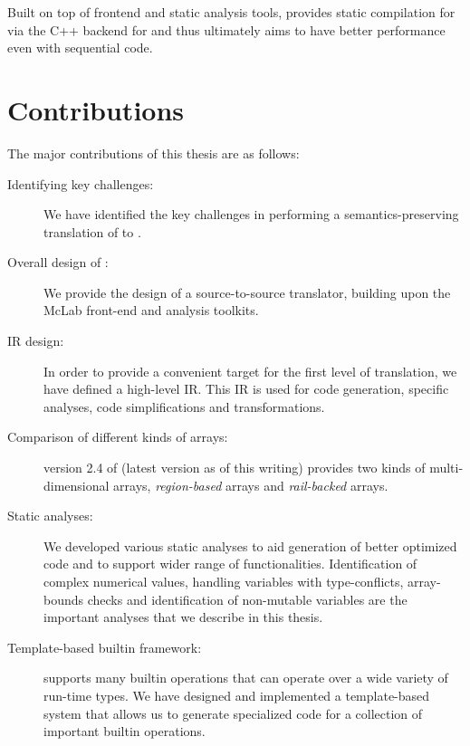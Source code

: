  Built on top of \mclab frontend and static analysis tools,
 \mixten provides static compilation for \matlab via the C++
backend for \xten and thus ultimately aims to have better performance even with
sequential code. 

\section{Contributions}
  
The major contributions  of this thesis are as follows:

\begin{description}

\item[Identifying key challenges:] We have identified the key challenges
in performing a semantics-preserving translation of \matlab to \xten.

\item[Overall design of \mixten:] We provide the design of a 
source-to-source translator, building upon the McLab front-end and
analysis toolkits.

\item[\mixten IR design:] In order to provide a convenient
target for the first level of translation, we have defined a high-level
\mixten IR.  This IR is used for code generation, \xten specific analyses, 
code simplifications and transformations.

\item[Comparison of different kinds of \xten arrays:] version 2.4 of \xten 
(latest version as of this writing) provides two kinds of multi-dimensional 
arrays, \emph{region-based} arrays and \emph{rail-backed} arrays.  

\item[Static analyses:] We developed various static analyses to aid generation
of better optimized code and to support wider range of \matlab functionalities.
Identification of complex numerical values, handling variables with	
type-conflicts, array-bounds checks and identification of non-mutable variables
are the important analyses that we describe in this thesis.

\item[Template-based builtin framework:] \matlab supports many builtin
operations that can operate over a wide variety of run-time types.  We
have designed and implemented a template-based system that allows us to
generate specialized \xten code for a collection of important builtin
operations.


\end{description}
